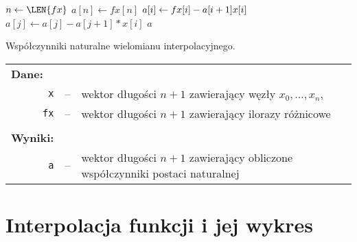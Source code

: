 \documentclass[11pt]{mk-polish-lab-report}
\let\times\relax%
\DeclareMathOperator{\times}{\cdot}
\begin{document}
		\begin{algorithm}[h]
			\DontPrintSemicolon
			

		    	 {
		    		$n \gets \LEN{fx}$\;
		    		$a[n] \gets fx[n]$\;
		    		 {
		    			$a[i] \gets fx[i] - a[i+1] \times x[i]$\; 
		    			 {
		    				$a[j] \gets a[j] - a[j+1] * x[i]$\; 	
					}	
		    		}
		    		\KwRet $a$\;
    			}

    			\caption{Współczynniki naturalne wielomianu interpolacyjnego.}
    			\label{alg:zad3}
		\end{algorithm}	
\begin{longtable}[l]{r  c  l}
\multicolumn{1}{l}{\textbf{Dane:}}&& \\
\texttt{x}&--&wektor długości $n+1$ zawierający węzły $x_0, \ldots, x_n$, \\
\texttt{fx}&--&wektor długości $n+1$ zawierający ilorazy różnicowe \\
&& \\
\multicolumn{1}{l}{\textbf{Wyniki:}}&& \\
\texttt{a}&--&wektor długości $n+1$ zawierający obliczone współczynniki postaci naturalnej \\
\end{longtable}

\section{Interpolacja funkcji i jej wykres}
\end{document}

